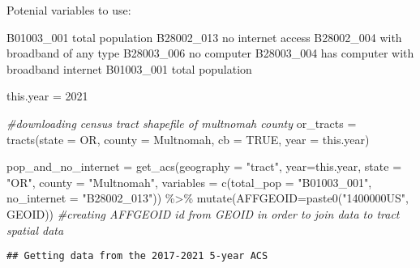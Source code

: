 \documentclass[
]{article}
\newenvironment{Shaded}{\begin{snugshade}}{\end{snugshade}}
\newcommand{\AttributeTok}[1]{\textcolor[rgb]{0.77,0.63,0.00}{#1}}
\newcommand{\CommentTok}[1]{\textcolor[rgb]{0.56,0.35,0.01}{\textit{#1}}}
\newcommand{\ConstantTok}[1]{\textcolor[rgb]{0.00,0.00,0.00}{#1}}
\newcommand{\DecValTok}[1]{\textcolor[rgb]{0.00,0.00,0.81}{#1}}
\newcommand{\FunctionTok}[1]{\textcolor[rgb]{0.00,0.00,0.00}{#1}}
\newcommand{\NormalTok}[1]{#1}
\newcommand{\OtherTok}[1]{\textcolor[rgb]{0.56,0.35,0.01}{#1}}
\newcommand{\SpecialCharTok}[1]{\textcolor[rgb]{0.00,0.00,0.00}{#1}}
\newcommand{\StringTok}[1]{\textcolor[rgb]{0.31,0.60,0.02}{#1}}
\begin{document}
Potenial variables to use:

B01003\_001 total population B28002\_013 no internet access B28002\_004
with broadband of any type B28003\_006 no computer B28003\_004 has
computer with broadband internet B01003\_001 total population

\begin{Shaded}
\begin{Highlighting}[]
\NormalTok{this.year }\OtherTok{=} \DecValTok{2021}

\CommentTok{\#downloading census tract shapefile of multnomah county }
\NormalTok{or\_tracts }\OtherTok{=} \FunctionTok{tracts}\NormalTok{(}\AttributeTok{state =} \StringTok{\textquotesingle{}OR\textquotesingle{}}\NormalTok{, }\AttributeTok{county =} \StringTok{\textquotesingle{}Multnomah\textquotesingle{}}\NormalTok{, }\AttributeTok{cb =} \ConstantTok{TRUE}\NormalTok{, }\AttributeTok{year =}\NormalTok{ this.year)}

\NormalTok{pop\_and\_no\_internet }\OtherTok{=} \FunctionTok{get\_acs}\NormalTok{(}\AttributeTok{geography =} \StringTok{"tract"}\NormalTok{, }\AttributeTok{year=}\NormalTok{this.year,}
              \AttributeTok{state =} \StringTok{"OR"}\NormalTok{, }\AttributeTok{county =} \StringTok{"Multnomah"}\NormalTok{,}
              \AttributeTok{variables =} \FunctionTok{c}\NormalTok{(}\AttributeTok{total\_pop =} \StringTok{"B01003\_001"}\NormalTok{,}
                            \AttributeTok{no\_internet =} \StringTok{"B28002\_013"}\NormalTok{)) }\SpecialCharTok{\%\textgreater{}\%} 
                    \FunctionTok{mutate}\NormalTok{(}\AttributeTok{AFFGEOID=}\FunctionTok{paste0}\NormalTok{(}\StringTok{"1400000US"}\NormalTok{, GEOID)) }\CommentTok{\#creating AFFGEOID id from GEOID in order to join data to tract spatial data}
\end{Highlighting}
\end{Shaded}

\begin{verbatim}
## Getting data from the 2017-2021 5-year ACS
\end{verbatim}
\end{document}
